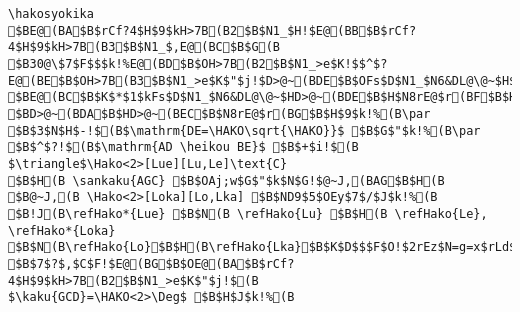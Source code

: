 \begin{verbatim}
\hakosyokika
$BE@(BA$B$rCf?4$H$9$kH>7B(B2$B$N1_$H!$E@(BB$B$rCf?4$H$9$kH>7B(B3$B$N1_$,E@(BC$B$G(B
$B30@\$7$F$$$k!%E@(BD$B$OH>7B(B2$B$N1_>e$K!$$^$?E@(BE$B$OH>7B(B3$B$N1_>e$K$"$j!$D>@~(BDE$B$OFs$D$N1_$N6&DL@\@~$H$J$C$F$$$k!%(B
$BE@(BC$B$K$*$1$kFs$D$N1_$N6&DL@\@~$HD>@~(BDE$B$H$N8rE@$r(BF$B$H$7!$(B
$BD>@~(BDA$B$HD>@~(BEC$B$N8rE@$r(BG$B$H$9$k!%(B\par
$B$3$N$H$-!$(B$\mathrm{DE=\HAKO\sqrt{\HAKO}}$ $B$G$"$k!%(B\par
$B$^$?!$(B$\mathrm{AD \heikou BE}$ $B$+$i!$(B
$\triangle$\Hako<2>[Lue][Lu,Le]\text{C}
$B$H(B \sankaku{AGC} $B$OAj;w$G$"$k$N$G!$@~J,(BAG$B$H(B
$B@~J,(B \Hako<2>[Loka][Lo,Lka] $B$ND9$5$OEy$7$/$J$k!%(B
$B!J(B\refHako*{Lue} $B$N(B \refHako{Lu} $B$H(B \refHako{Le}, 
\refHako*{Loka} $B$N(B\refHako{Lo}$B$H(B\refHako{Lka}$B$K$D$$$F$O!$2rEz$N=g=x$rLd$o$J$$!%!K(B\par
$B$7$?$,$C$F!$E@(BG$B$OE@(BA$B$rCf?4$H$9$kH>7B(B2$B$N1_>e$K$"$j!$(B
$\kaku{GCD}=\HAKO<2>\Deg$ $B$H$J$k!%(B
\end{verbatim}

